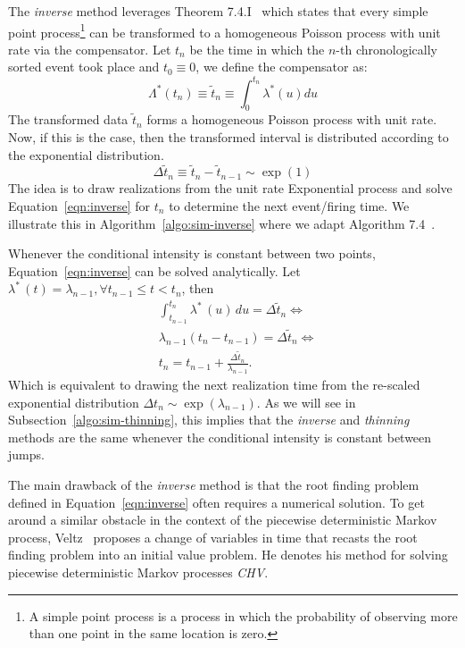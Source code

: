 \documentclass{juliacon}
\numberwithin{equation}{section}
\begin{document}
The \textit{inverse} method leverages Theorem 7.4.I~\cite{daley2003} which states that every simple point process\footnote{A simple point process is a process in which the probability of observing more than one point in the same location is zero.} can be transformed to a homogeneous Poisson process with unit rate via the compensator. Let \( t_n \) be the time in which the \( n \)-th chronologically sorted event took place and \( t_0 \equiv 0 \), we define the compensator as:
\begin{equation} \label{eqn:compensator}
  \Lambda^\ast (t_n) \equiv \tilde{t}_n \equiv \int_0^{t_n} \lambda^\ast (u) du
\end{equation}
The transformed data \( \tilde{t}_n \) forms a homogeneous Poisson process with unit rate. Now, if this is the case, then the transformed interval is distributed according to the exponential distribution.
\begin{equation}\label{eqn:inverse}
  \Delta \tilde{t}_n \equiv \tilde{t}_n - \tilde{t}_{n-1} \sim \exp(1)
\end{equation}
The idea is to draw realizations from the unit rate Exponential process and solve Equation~\ref{eqn:inverse} for \( t_n \)  to determine the next event/firing time. We illustrate this in Algorithm~\ref{algo:sim-inverse} where we adapt Algorithm 7.4~\cite{daley2003}.

Whenever the conditional intensity is constant between two points, Equation~\ref{eqn:inverse} can be solved analytically. Let \( \lambda^\ast \, (t) = \lambda_{n-1} , \forall t_{n-1} \leq t < t_n \), then
\begin{equation}
\begin{split}
  &\int_{t_{n-1}}^{t_n} \lambda^\ast \, (u) \, du = \Delta \tilde{t}_{n} \iff \\
  &\lambda_{n-1} (t_n - t_{n-1}) = \Delta \tilde{t}_n \iff \\
  &t_n = t_{n-1} + \frac{\Delta \tilde{t}_n}{\lambda_{n-1}}.
\end{split}
\end{equation}
Which is equivalent to drawing the next realization time from the re-scaled exponential distribution \( \Delta t_n \sim \exp(\lambda_{n-1}) \). As we will see in Subsection~\ref{algo:sim-thinning}, this implies that the \textit{inverse} and \textit{thinning} methods are the same whenever the conditional intensity is constant between jumps.

The main drawback of the \textit{inverse} method is that the root finding problem defined in Equation~\ref{eqn:inverse} often requires a numerical solution. To get around a similar obstacle in the context of the piecewise deterministic Markov process, Veltz~\cite{veltz2015} proposes a change of variables in time that recasts the root finding problem into an initial value problem. He denotes his method for solving piecewise deterministic Markov processes \textit{CHV}.
\end{document}
